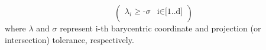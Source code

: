\begin{equation} \label{eq:projtol}
	\left(
\begin{array}{cc}
 \lambda _i\text{$\geq $-$\sigma $} & \text{i$\in $[1..d]} \\
\end{array}
\right)
\end{equation}
where $\lambda$ and $\sigma$ represent i-th barycentric coordinate and projection (or intersection) tolerance, respectively.